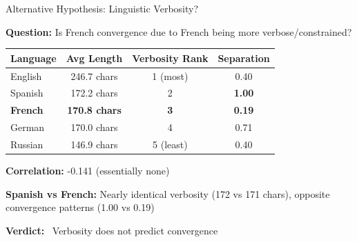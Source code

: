 \documentclass[aspectratio=169,11pt]{beamer}
\newcommand{\bad}{\textcolor{darkred}{\ding{55}}}
\begin{document}
\begin{frame}{Alternative Hypothesis: Linguistic Verbosity?}

\textbf{Question:} Is French convergence due to French being more verbose/constrained?

\vspace{0.5em}

\begin{center}
\begin{tabular}{lccc}
\toprule
\textbf{Language} & \textbf{Avg Length} & \textbf{Verbosity Rank} & \textbf{Separation} \\
\midrule
English & 246.7 chars & 1 (most) & 0.40 \\
Spanish & 172.2 chars & 2 & \textbf{1.00} \\
\textbf{French} & \textbf{170.8 chars} & \textbf{3} & \textbf{0.19} \\
German & 170.0 chars & 4 & 0.71 \\
Russian & 146.9 chars & 5 (least) & 0.40 \\
\bottomrule
\end{tabular}
\end{center}

\vspace{0.5em}

\textbf{Correlation:} -0.141 (essentially none)

\vspace{0.5em}

\textbf{Spanish vs French:} Nearly identical verbosity (172 vs 171 chars), opposite convergence patterns (1.00 vs 0.19)

\vspace{0.5em}

\textbf{Verdict:} \bad\ Verbosity does not predict convergence

\end{frame}
\end{document}
